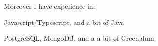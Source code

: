 Moreover I have experience in:
\begin{bulist}
  \item Javascript/Typescript, and a bit of Java
  \item PostgreSQL, MongoDB, and a a bit of Greenplum
\end{bulist}

